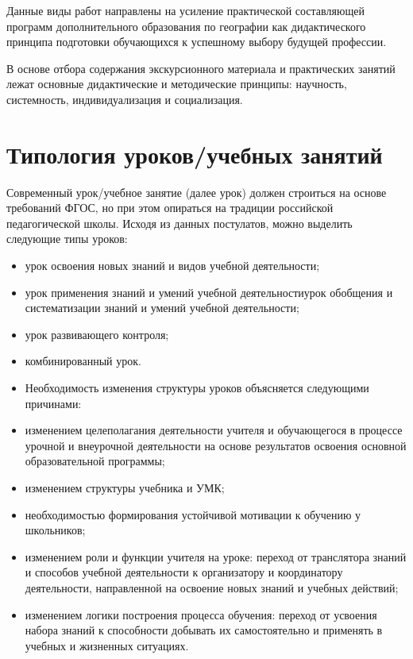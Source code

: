 \documentclass[
  11pt,
  russian,
]{book}
\begin{document}
Данные виды работ направлены на усиление практической составляющей
программ дополнительного образования по географии как дидактического
принципа подготовки обучающихся к успешному выбору будущей профессии.

В основе отбора содержания экскурсионного материала и практических
занятий лежат основные дидактические и методические принципы: научность,
системность, индивидуализация и социализация.

\hypertarget{ux442ux438ux43fux43eux43bux43eux433ux438ux44f-ux443ux440ux43eux43aux43eux432ux443ux447ux435ux431ux43dux44bux445-ux437ux430ux43dux44fux442ux438ux439}{%
\section*{Типология уроков/учебных
занятий}\label{ux442ux438ux43fux43eux43bux43eux433ux438ux44f-ux443ux440ux43eux43aux43eux432ux443ux447ux435ux431ux43dux44bux445-ux437ux430ux43dux44fux442ux438ux439}}

Современный урок/учебное занятие (далее урок) должен строиться на основе
требований ФГОС, но при этом опираться на традиции российской
педагогической школы. Исходя из данных постулатов, можно выделить
следующие типы уроков:

\begin{itemize}
\item
  урок освоения новых знаний и видов учебной деятельности;
\item
  урок применения знаний и умений учебной деятельностиурок обобщения и
  систематизации знаний и умений учебной деятельности;
\item
  урок развивающего контроля;
\item
  комбинированный урок.
\item
  Необходимость изменения структуры уроков объясняется следующими
  причинами:
\item
  изменением целеполагания деятельности учителя и обучающегося в
  процессе урочной и внеурочной деятельности на основе результатов
  освоения основной образовательной программы;
\item
  изменением структуры учебника и УМК;
\item
  необходимостью формирования устойчивой мотивации к обучению у
  школьников;
\item
  изменением роли и функции учителя на уроке: переход от транслятора
  знаний и способов учебной деятельности к организатору и координатору
  деятельности, направленной на освоение новых знаний и учебных
  действий;
\item
  изменением логики построения процесса обучения: переход от усвоения
  набора знаний к способности добывать их самостоятельно и применять в
  учебных и жизненных ситуациях.
\end{itemize}
\end{document}
